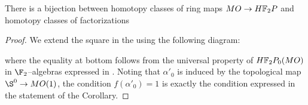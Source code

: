 \begin{corollary}\label{MOOrientationsVsRPClasses}
There is a bijection between homotopy classes of ring maps \(MO \to \HFtwo P\) and homotopy classes of factorizations
\begin{center}
\end{center}
\end{corollary}
\begin{proof}
We extend the square in the  using the following diagram:
\begin{center}
\end{center}
where the equality at bottom follows from the universal property of \(\HFtwo P_0(MO)\) in \(\F_2\)--algebras expressed in .  Noting that \(\alpha'_0\) is induced by the topological map \(\S^0 \to MO(1)\), the condition \(f(\alpha'_0) = 1\) is exactly the condition expressed in the statement of the Corollary.
\end{proof}

